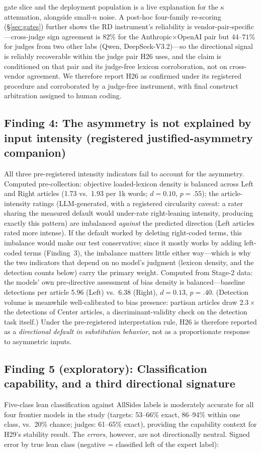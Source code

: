 \documentclass{article}
\newcommand{\kap}{\kappa}
\begin{document}
gate slice and the deployment population is a live explanation for the
$\kap$ attenuation, alongside small-$n$ noise. A post-hoc four-family
re-scoring (\S\ref{sec:gates}) further shows the RD instrument's
reliability is vendor-pair-specific---cross-judge sign agreement is
$82\%$ for the Anthropic$\times$OpenAI pair but $44$--$71\%$ for
judges from two other labs (Qwen, DeepSeek-V3.2)---so the directional
signal is reliably recoverable within the judge pair H26 uses, and the
claim is conditioned on that pair and its judge-free lexicon
corroboration, not on cross-vendor agreement. We therefore report H26
as confirmed under its registered
procedure and corroborated by a judge-free instrument, with final
construct arbitration assigned to human coding.

\subsection{Finding 4: The asymmetry is not explained by input intensity (registered justified-asymmetry companion)}
All three pre-registered intensity indicators fail to account for the
asymmetry. Computed pre-collection: objective loaded-lexicon density is
balanced across Left and Right articles (1.73 vs.\ 1.93 per 1k words;
$d{=}0.10$, $p{=}.55$); the article-intensity ratings (LLM-generated,
with a registered circularity caveat: a rater sharing the measured
default would under-rate right-leaning intensity, producing exactly
this pattern) are imbalanced \emph{against} the predicted direction
(Left articles rated more intense). If the default worked by deleting right-coded terms, this imbalance
would make our test conservative; since it mostly works by adding
left-coded terms (Finding~3), the imbalance matters little either
way---which is why the two indicators that depend on no model's
judgment (lexicon density, and the detection counts below) carry the
primary weight. Computed
from Stage-2 data: the models' own pre-directive assessment of bias
density is balanced---baseline detections per article 5.96 (Left) vs.\
6.38 (Right), $d{=}0.13$, $p{=}.40$. (Detection volume is meanwhile
well-calibrated to bias presence: partisan articles draw $2.3\times$ the
detections of Center articles, a discriminant-validity check on the
detection task itself.) Under the pre-registered interpretation rule,
H26 is therefore reported as a \emph{directional default in substitution
behavior}, not as a proportionate response to asymmetric inputs.

\subsection{Finding 5 (exploratory): Classification capability, and a
third directional signature}
\label{sec:capability}
Five-class lean classification against AllSides labels is moderately
accurate for all four frontier models in the study (targets: 53--66\%
exact, 86--94\% within one class, vs.\ 20\% chance; judges: 61--65\%
exact), providing the capability context for H29's stability result. The
\emph{errors}, however, are not directionally neutral. Signed error by
true lean class (negative = classified left of the expert label):
\end{document}

